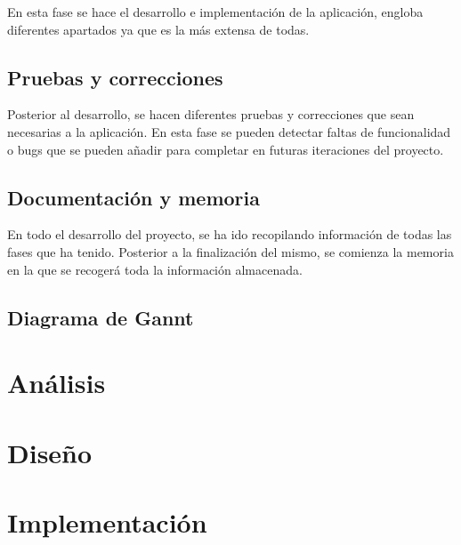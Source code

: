 \documentclass[a4paper, 12pt]{article}
\begin{document}
En esta fase se hace el desarrollo e implementación de la aplicación, engloba diferentes apartados ya que es la más extensa de todas.

\subsection{Pruebas y correcciones}

Posterior al desarrollo, se hacen diferentes pruebas y correcciones que sean necesarias a la aplicación. En esta fase se pueden detectar faltas de funcionalidad o bugs que se pueden añadir para completar en futuras iteraciones del proyecto.

\subsection{Documentación y memoria}

En todo el desarrollo del proyecto, se ha ido recopilando información de todas las fases que ha tenido. Posterior a la finalización del mismo, se comienza la memoria en la que se recogerá toda la información almacenada. 

\subsection{Diagrama de Gannt}

\newpage
\section{Análisis}

\newpage
\section{Diseño}

\newpage
\section{Implementación}

\printindex
\end{document}
